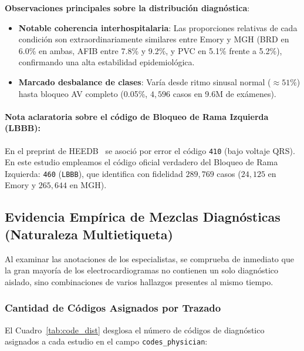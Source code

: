 \documentclass[11pt,a4paper]{article}
\begin{document}
\textbf{Observaciones principales sobre la distribución diagnóstica}:
\begin{itemize}
    \item \textbf{Notable coherencia interhospitalaria}: Las proporciones relativas de cada condición son extraordinariamente similares entre Emory y MGH (BRD en 6.0\% en ambas, AFIB entre 7.8\% y 9.2\%, y PVC en 5.1\% frente a 5.2\%), confirmando una alta estabilidad epidemiológica.
    \item \textbf{Marcado desbalance de clases}: Varía desde ritmo sinusal normal ($\approx 51\%$) hasta bloqueo AV completo (0.05\%, $4{,}596$ casos en 9.6M de exámenes).
\end{itemize}

\paragraph{Nota aclaratoria sobre el código de Bloqueo de Rama Izquierda (LBBB):}
En el preprint de HEEDB~\cite{koscova2024} se asoció por error el código \texttt{410} (bajo voltaje QRS). En este estudio empleamos el código oficial verdadero del Bloqueo de Rama Izquierda: \texttt{460} (\texttt{LBBB}), que identifica con fidelidad $289{,}769$ casos ($24{,}125$ en Emory y $265{,}644$ en MGH).
\newpage

\subsection{Evidencia Empírica de Mezclas Diagnósticas (Naturaleza Multietiqueta)}
Al examinar las anotaciones de los especialistas, se comprueba de inmediato que la gran mayoría de los electrocardiogramas no contienen un solo diagnóstico aislado, sino combinaciones de varios hallazgos presentes al mismo tiempo.

\subsubsection{Cantidad de Códigos Asignados por Trazado}
El Cuadro~\ref{tab:code_dist} desglosa el número de códigos de diagnóstico asignados a cada estudio en el campo \texttt{codes\_physician}:
\end{document}
